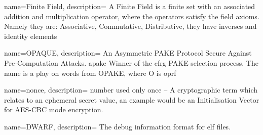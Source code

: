 {
  name={Finite Field},
  description={
    A Finite Field is a finite set with an associated addition and multiplication operator, where the operators satisfy the field axioms. Namely they are: Associative, Commutative, Distributive, they have inverses and identity elements%
  }
}

 {
  name={OPAQUE},
  description={
    An Asymmetric PAKE Protocol Secure Against Pre-Computation Attacks.
    \gls{apake} Winner of the \gls{cfrg} PAKE selection process.
    The name is a play on words from OPAKE, where O is \gls{oprf}%
  }
}

 {
  name={nonce},
  description={
    number used only once -- A cryptographic term which relates to an ephemeral secret value, an example would be an Initialisation Vector for AES-CBC mode encryption.
  }
}

 {
  name={DWARF},
  description={
    The debug information format for \gls{elf} files.
  }
}

